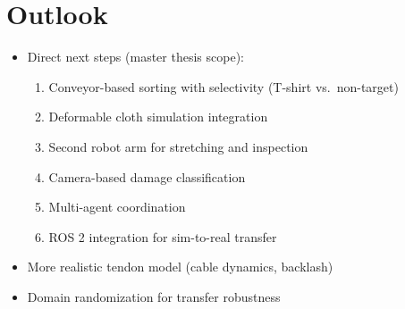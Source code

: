 \section{Outlook}
\begin{itemize}
    \item Direct next steps (master thesis scope):
    \begin{enumerate}
        \item Conveyor-based sorting with selectivity (T-shirt vs.\ non-target)
        \item Deformable cloth simulation integration
        \item Second robot arm for stretching and inspection
        \item Camera-based damage classification
        \item Multi-agent coordination
        \item ROS 2 integration for sim-to-real transfer
    \end{enumerate}
    \item More realistic tendon model (cable dynamics, backlash)
    \item Domain randomization for transfer robustness
\end{itemize}
